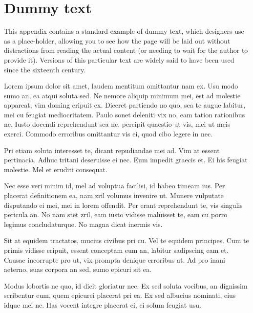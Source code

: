 \chapter{Dummy text}
%
%

This appendix contains a standard example of dummy text, which designers use as a place-holder, allowing you to see how the page will be laid out without distractions from reading the actual content (or needing to wait for the author to provide it). Versions of this particular text are widely said to have been used since the sixteenth century.

Lorem ipsum dolor sit amet, laudem mentitum omittantur nam ex. Usu modo sumo an, ea atqui soluta sed. Ne nemore aliquip minimum mei, est ad molestie appareat, vim doming eripuit ex. Diceret partiendo no quo, sea te augue labitur, mei cu feugiat mediocritatem. Paulo sonet deleniti vix no, eam tation rationibus ne. Iusto docendi reprehendunt sea ne, percipit quaestio ut vis, mei ut meis exerci. Commodo erroribus omittantur vis ei, quod cibo legere in nec.

Pri etiam soluta interesset te, dicant repudiandae mei ad. Vim at essent pertinacia. Adhuc tritani deseruisse ei nec. Eum impedit graecis et. Ei his feugiat molestie. Mel et eruditi consequat.

Nec esse veri minim id, mel ad voluptua facilisi, id habeo timeam ius. Per placerat definitionem ea, nam zril volumus invenire ut. Munere vulputate disputando ei mei, mei in lorem offendit. Per erant reprehendunt te, vis singulis pericula an. No nam stet zril, eam iusto vidisse maluisset te, eam cu porro legimus concludaturque. No magna dicat inermis vis.

Sit at equidem tractatos, mucius civibus pri cu. Vel te equidem principes. Cum te primis vidisse eripuit, essent conceptam eum an, labitur sadipscing eam et. Causae incorrupte pro ut, vix prompta denique erroribus at. Ad pro inani aeterno, suas corpora an sed, sumo epicuri sit ea.

Modus lobortis ne quo, id dicit gloriatur nec. Ex sed soluta vocibus, an dignissim scribentur eum, quem epicurei placerat pri ea. Ex sed albucius nominati, eius idque mei ne. Has vocent integre placerat ei, ei solum feugiat usu.